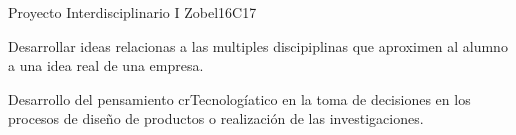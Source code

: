 \begin{syllabus}
\begin{unit}{Proyecto Interdisciplinario I }{}{Zobel}{16}{C17}
\begin{topics}
      \item Desarrollar ideas relacionas a las multiples discipiplinas  que aproximen al alumno a una idea real de una empresa.
\end{topics}

\begin{learningoutcomes}
   \item Desarrollo del pensamiento crTecnologíatico en la toma de decisiones en los procesos de diseño de productos o realización de las investigaciones.
\end{learningoutcomes}
\end{unit}

\begin{coursebibliography}
\end{coursebibliography}

\end{syllabus}
